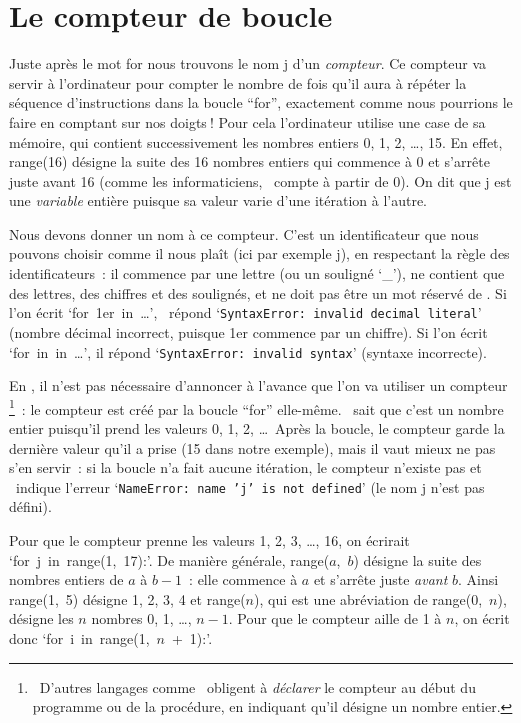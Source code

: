\section{Le compteur de boucle}

Juste après le mot {\mcl for} nous trouvons le nom {\idt j} d'un
{\em compteur}. Ce compteur va servir à l'ordinateur pour
compter le nombre de fois qu'il aura à répéter la séquence d'instructions dans la
boucle ``for'', exactement comme nous pourrions le faire en comptant sur nos  doigts$\:$!
Pour cela l'ordinateur utilise une case de sa mémoire, qui contient successivement
les nombres entiers 0, 1, 2, \ldots, 15. En effet, {\idt range(16)} désigne la suite des
16 nombres entiers qui commence à 0 et s'arrête juste avant 16 (comme les informaticiens,
\python\ compte à partir de 0). On dit que {\idt j} est une
{\em variable} entière puisque sa valeur varie
d'une itération à l'autre.

Nous devons donner un nom à ce compteur. C'est un identificateur que nous pouvons choisir
comme il nous plaît (ici par exemple {\idt  j}), en respectant la règle des
identificateurs~: il commence par une lettre (ou un souligné `\_'), ne contient que des lettres, des chiffres et des soulignés, et ne doit pas être un mot réservé de
\python. Si l'on écrit `{\mcl for}\ {\idt 1er}\ {\mcl in}\ \ldots', \python\ répond
`{\tt SyntaxError: invalid decimal literal}' (nombre décimal incorrect, puisque
{\idt 1er} commence par un chiffre). Si l'on écrit `{\mcl for}\ {\mcl in}\ {\mcl in}\ \ldots',
il répond `{\tt SyntaxError: invalid syntax}' (syntaxe incorrecte).

En \python, il n'est pas nécessaire d'annoncer à l'avance que l'on va utiliser
un compteur%
\footnote{\ D'autres langages comme \pascal\ obligent à {\em déclarer} le compteur au début
du programme ou de la procédure, en indiquant qu'il désigne un nombre entier.}~:
le compteur est créé par la boucle ``for'' elle-même. \python\
sait que c'est un nombre entier puisqu'il prend les valeurs 0, 1, 2, \ldots\ Après la
boucle, le compteur garde la dernière valeur qu'il a prise (15 dans notre exemple), mais
il vaut mieux ne pas s'en servir~: si la boucle n'a fait aucune itération, le
compteur n'existe pas et \python\ indique l'erreur
`{\tt NameError: name 'j' is not defined}' (le nom {\idt j} n'est pas défini).

Pour que le compteur prenne les valeurs 1, 2, 3, \ldots, 16, on écrirait
`{\mcl for}\ {\idt j}\ {\mcl in}\ {\idt range(1,\ 17):}'. De manière générale,
{\idt range(}$a${\idt ,\ }$b${\idt )} désigne la suite des nombres entiers de $a$ à $b-1$~:
elle commence à $a$ et s'arrête juste {\em avant} $b$. Ainsi {\idt range(1,\ 5)} désigne
1, 2, 3, 4 et {\idt range(}$n${\idt )}, qui est une abréviation de
{\idt range(0,\ }$n${\idt )}, désigne les $n$ nombres 0, 1, \ldots, $n-1$.
Pour que le compteur aille de 1 à $n$, on écrit donc
`{\mcl for}\ {\idt i}\ {\mcl in}\ {\idt range(1,\ }$n${\idt \ +\ 1):}'.

